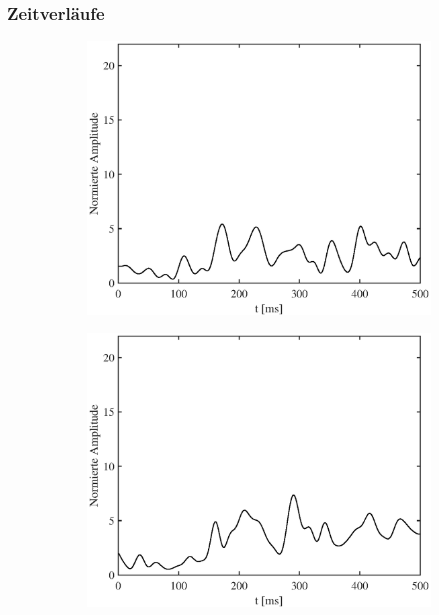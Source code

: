 \documentclass[doc,a4paper,12pt]{apa6}
\begin{document}
\subsubsection{Zeitverläufe}

\begin{figure}
  \captionsetup{justification=centering}
  \begin{subfigure}[c]{0.47\textwidth}
    \includegraphics[width=\textwidth]{ergebnisse/timecourse/pa07_eve2_raw_lcmv_timecourse_right.eps}
    \label{img:pa07:zeit:raw-lcmv}
  \end{subfigure}\hspace*{0.04\textwidth}
  \begin{subfigure}[c]{0.47\textwidth}
    \includegraphics[width=\textwidth]{ergebnisse/timecourse/pa07_eve2_raw_mne_timecourse_right.eps}

\end{subfigure}
\end{figure}
\end{document}
